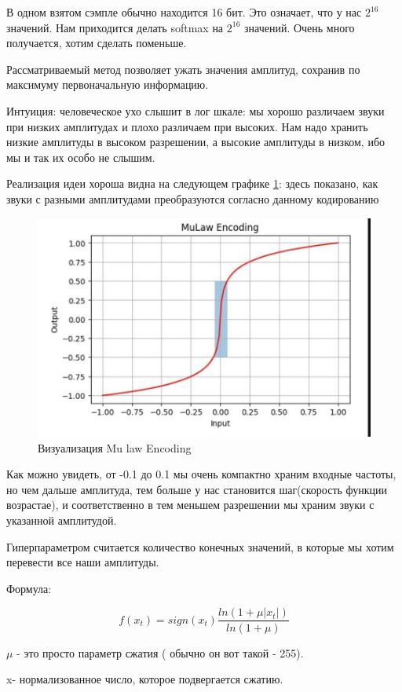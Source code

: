	
	
	В одном взятом сэмпле обычно находится 16 бит. Это означает, что у нас $2^{16}$ значений. Нам приходится делать softmax на $2^{16}$ значений. Очень много получается, хотим сделать поменьше. 
	
	Рассматриваемый метод позволяет ужать значения амплитуд, сохранив по максимуму первоначальную информацию. 
	
	Интуиция: человеческое ухо слышит в лог шкале: мы хорошо различаем звуки при низких амплитудах и плохо различаем при высоких. Нам надо хранить низкие амплитуды в высоком разрешении, а высокие амплитуды в низком, ибо мы и так их особо не слышим. 
	
	Реализация идеи хороша видна на следующем графике \ref{fig:12_plot}: здесь показано, как звуки с разными амплитудами преобразуются согласно данному кодированию 
	
	
		\begin{figure}[H]
\centering
\includegraphics[width=0.7\linewidth]{12_trans.jpg}
\caption{Визуализация Mu law Encoding}
\label{fig:12_plot}
\end{figure}

Как можно увидеть, от -0.1 до 0.1 мы очень компактно храним входные частоты, но чем дальше амплитуда, тем больше у нас становится шаг(скорость функции возрастае), и соответственно в тем меньшем разрешении мы храним звуки с указанной амплитудой. 

Гиперпараметром считается количество конечных значений, в которые мы хотим перевести все наши амплитуды. 


Формула:

\begin{equation}
	    f(x_t) = sign(x_t) \dfrac{ln(1+\mu|x_t|)}{ln(1+\mu)}
	    \label{eq:12_formula}
\end{equation}
	
$\mu$ - это просто параметр сжатия ( обычно он вот такой - 255). 

x- нормализованное число, которое подвергается сжатию. 
